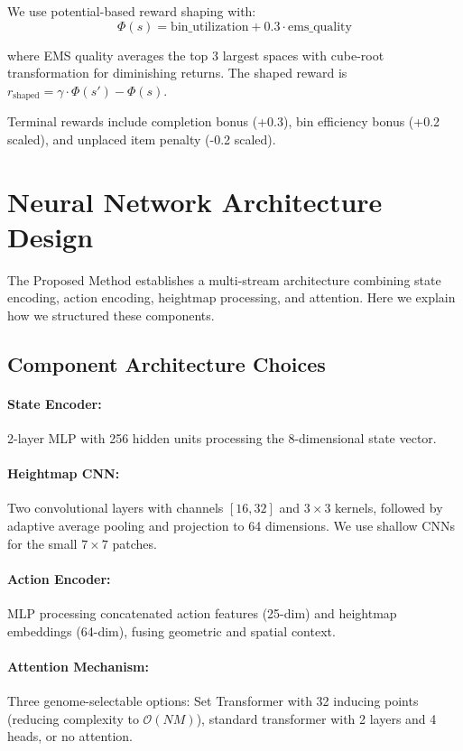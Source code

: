 We use potential-based reward shaping with:
\begin{equation}
\Phi(s) = \text{bin\_utilization} + 0.3 \cdot \text{ems\_quality}
\end{equation}

where EMS quality averages the top 3 largest spaces with cube-root transformation for diminishing returns. The shaped reward is $r_{\text{shaped}} = \gamma \cdot \Phi(s') - \Phi(s)$.

Terminal rewards include completion bonus (+0.3), bin efficiency bonus (+0.2 scaled), and unplaced item penalty (-0.2 scaled).

\section{Neural Network Architecture Design}

The Proposed Method establishes a multi-stream architecture combining state encoding, action encoding, heightmap processing, and attention. Here we explain how we structured these components.

\subsection{Component Architecture Choices}

\paragraph{State Encoder:} 2-layer MLP with 256 hidden units processing the 8-dimensional state vector.

\paragraph{Heightmap CNN:} Two convolutional layers with channels $[16, 32]$ and $3 \times 3$ kernels, followed by adaptive average pooling and projection to 64 dimensions. We use shallow CNNs for the small $7 \times 7$ patches.

\paragraph{Action Encoder:} MLP processing concatenated action features (25-dim) and heightmap embeddings (64-dim), fusing geometric and spatial context.

\paragraph{Attention Mechanism:} Three genome-selectable options: Set Transformer with 32 inducing points (reducing complexity to $\mathcal{O}(NM)$), standard transformer with 2 layers and 4 heads, or no attention.


